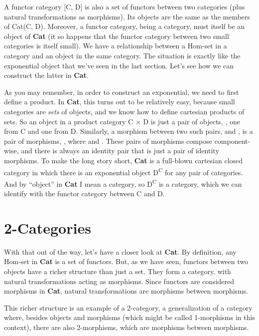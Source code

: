 A functor category {[}C, D{]} is also a set of functors between two
categories (plus natural transformations as morphisms). Its objects are
the same as the members of Cat(C, D). Moreover, a functor category,
being a category, must itself be an object of \textbf{Cat} (it so
happens that the functor category between two small categories is itself
small). We have a relationship between a Hom-set in a category and an
object in the same category. The situation is exactly like the
exponential object that we've seen in the last section. Let's see how we
can construct the latter in \textbf{Cat}.

As you may remember, in order to construct an exponential, we need to
first define a product. In \textbf{Cat}, this turns out to be relatively
easy, because small categories are \emph{sets} of objects, and we know
how to define cartesian products of sets. So an object in a product
category C × D is just a pair of objects, , one from C
and one from D. Similarly, a morphism between two such pairs,
 and , is a pair of
morphisms, , where
 and
. These pairs of morphisms
compose component-wise, and there is always an identity pair that is
just a pair of identity morphisms. To make the long story short,
\textbf{Cat} is a full-blown cartesian closed category in which there is
an exponential object D\textsuperscript{C} for any pair of categories.
And by ``object'' in \textbf{Cat} I mean a category, so
D\textsuperscript{C} is a category, which we can identify with the
functor category between C and D.

\section{2-Categories}\label{categories}

With that out of the way, let's have a closer look at \textbf{Cat}. By
definition, any Hom-set in \textbf{Cat} is a set of functors. But, as we
have seen, functors between two objects have a richer structure than
just a set. They form a category, with natural transformations acting as
morphisms. Since functors are considered morphisms in \textbf{Cat},
natural transformations are morphisms between morphisms.

This richer structure is an example of a 2-category, a generalization of
a category where, besides objects and morphisms (which might be called
1-morphisms in this context), there are also 2-morphisms, which are
morphisms between morphisms.


